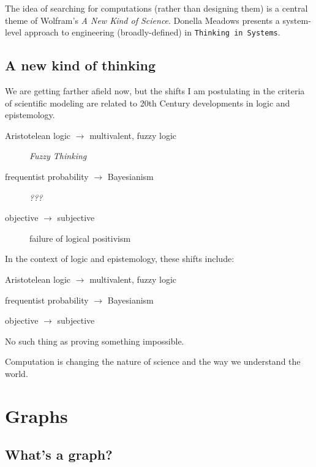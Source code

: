 \documentclass[10pt]{book}
\begin{document}
The idea of searching for computations (rather than designing them) is
a central theme of Wolfram's {\em A New Kind of Science}.  Donella
Meadows presents a system-level approach to engineering
(broadly-defined) in {\tt Thinking in Systems}.


\section{A new kind of thinking}

We are getting farther afield now, but the shifts I am postulating
in the criteria of scientific modeling are related to 20th Century
developments in logic and epistemology.

\begin{description}

\item[Aristotelean logic $\rightarrow$ multivalent, fuzzy logic] 
{\em Fuzzy Thinking}

\item[frequentist probability $\rightarrow$ Bayesianism] 
{\em ???}

\item[objective $\rightarrow$ subjective] 
failure of logical positivism


\end{description}







In the context of logic and epistemology, these shifts include:

Aristotelean logic $\rightarrow$ multivalent, fuzzy logic

frequentist probability $\rightarrow$ Bayesianism

objective $\rightarrow$ subjective


No such thing as proving something impossible.


Computation is changing the nature of science and the way we understand the world.



\chapter{Graphs}

\section{What's a graph?}
\end{document}
